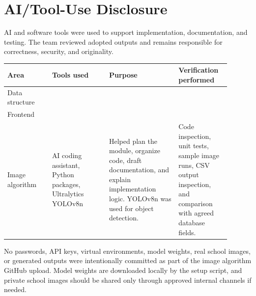 \section{AI/Tool-Use Disclosure}

AI and software tools were used to support implementation, documentation, and testing. The team reviewed adopted outputs and remains responsible for correctness, security, and originality.

\begin{longtable}{|p{0.18\linewidth}|p{0.23\linewidth}|p{0.29\linewidth}|p{0.20\linewidth}|}
\hline
\textbf{Area} & \textbf{Tools used} & \textbf{Purpose} & \textbf{Verification performed} \\
\hline
Data structure &  &  &  \\
\hline
Frontend &  &  &  \\
\hline
Image algorithm & AI coding assistant, Python packages, Ultralytics YOLOv8n & Helped plan the module, organize code, draft documentation, and explain implementation logic. YOLOv8n was used for object detection. & Code inspection, unit tests, sample image runs, CSV output inspection, and comparison with agreed database fields. \\
\hline
\end{longtable}


No passwords, API keys, virtual environments, model weights, real school images, or generated outputs were intentionally committed as part of the image algorithm GitHub upload. Model weights are downloaded locally by the setup script, and private school images should be shared only through approved internal channels if needed.
